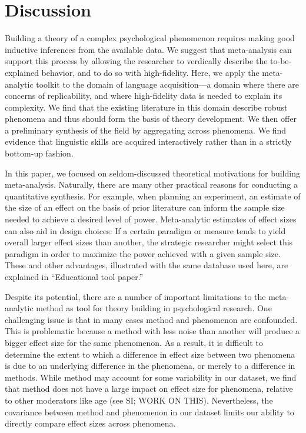 \documentclass[english,floatsintext,man]{apa6}
\begin{document}
\section{Discussion}\label{discussion}

Building a theory of a complex psychological phenomenon requires making
good inductive inferences from the available data. We suggest that
meta-analysis can support this process by allowing the researcher to
verdically describe the to-be-explained behavior, and to do so with
high-fidelity. Here, we apply the meta-analytic toolkit to the domain of
language acquisition---a domain where there are concerns of
replicability, and where high-fidelity data is needed to explain its
complexity. We find that the existing literature in this domain describe
robust phenomena and thus should form the basis of theory development.
We then offer a preliminary synthesis of the field by aggregating across
phenomena. We find evidence that linguistic skills are acquired
interactively rather than in a strictly bottom-up fashion.

In this paper, we focused on seldom-discussed theoretical motivations
for building meta-analysis. Naturally, there are many other practical
reasons for conducting a quantitative synthesis. For example, when
planning an experiment, an estimate of the size of an effect on the
basis of prior literature can inform the sample size needed to achieve a
desired level of power. Meta-analytic estimates of effect sizes can also
aid in design choices: If a certain paradigm or measure tends to yield
overall larger effect sizes than another, the strategic researcher might
select this paradigm in order to maximize the power achieved with a
given sample size. These and other advantages, illustrated with the same
database used here, are explained in \enquote{Educational tool paper.}

Despite its potential, there are a number of important limitations to
the meta-analytic method as tool for theory building in psychological
research. One challenging issue is that in many cases method and
phenomenon are confounded. This is problematic because a method with
less noise than another will produce a bigger effect size for the same
phenomenon. As a result, it is difficult to determine the extent to
which a difference in effect size between two phenomena is due to an
underlying difference in the phenomena, or merely to a difference in
methods. While method may account for some variability in our dataset,
we find that method does not have a large impact on effect size for
phenomena, relative to other moderators like age (see SI; WORK ON THIS).
Nevertheless, the covariance between method and phenomenon in our
dataset limits our ability to directly compare effect sizes across
phenomena.
\end{document}
